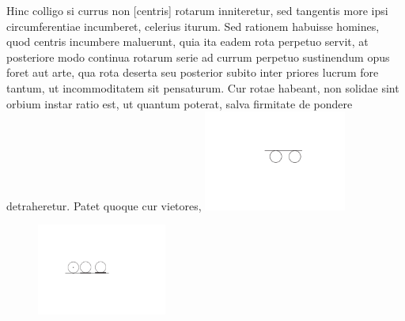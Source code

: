 \pend 
\pstart
   Hinc colligo si currus non [centris] rotarum inniteretur, sed tangentis more ipsi circumferentiae incumberet, celerius iturum. Sed rationem habuisse homines, quod centris incumbere maluerunt, quia ita eadem rota perpetuo servit, at posteriore modo continua rotarum serie ad currum perpetuo sustinendum opus foret aut arte, qua rota
deserta seu posterior subito inter priores  lucrum fore tantum, ut incommoditatem sit pensaturum. Cur rotae  habeant, non solidae sint orbium instar ratio est, ut quantum poterat, salva firmitate de pondere detraheretur. Patet quoque cur vietores,
\pend
\vspace{1.2em}
\pstart
\noindent\centering
\includegraphics[trim = 0mm -3mm -5mm 0mm, clip, width=0.35\textwidth]{images/lh03705_008-d4.pdf}\\
\noindent {} 
\pend 
\count{}
\pstart
\begin{figure}
 \vspace{-5mm}
\includegraphics[trim = 0mm -3mm 0mm 0mm, clip, width=0.38\textwidth]{images/lh03705_008-d5.pdf}\\
\noindent {}%
 \end{figure}
